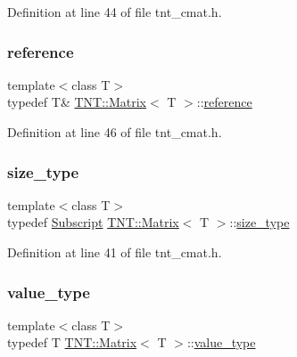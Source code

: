 Definition at line 44 of file tnt\+\_\+cmat.\+h.

\mbox{\label{classTNT_1_1Matrix_a129951783800dd85d3dcc1f6dd2062f9}} 
\subsubsection{\texorpdfstring{reference}{reference}}
{\footnotesize\ttfamily template$<$class T$>$ \\
typedef T\& \hyperlink{classTNT_1_1Matrix}{T\+N\+T\+::\+Matrix}$<$ T $>$\+::\hyperlink{classTNT_1_1Matrix_a129951783800dd85d3dcc1f6dd2062f9}{reference}}



Definition at line 46 of file tnt\+\_\+cmat.\+h.

\mbox{\label{classTNT_1_1Matrix_a42f57fd19de0ba2edce3734f41431727}} 
\subsubsection{\texorpdfstring{size\+\_\+type}{size\_type}}
{\footnotesize\ttfamily template$<$class T$>$ \\
typedef \hyperlink{namespaceTNT_af22e3f1460e145c04ce4e7d701e4c1c1}{Subscript} \hyperlink{classTNT_1_1Matrix}{T\+N\+T\+::\+Matrix}$<$ T $>$\+::\hyperlink{classTNT_1_1Matrix_a42f57fd19de0ba2edce3734f41431727}{size\+\_\+type}}



Definition at line 41 of file tnt\+\_\+cmat.\+h.

\mbox{\label{classTNT_1_1Matrix_a869b1a3e56a38bdaeb0b4f698b08e3c5}} 
\subsubsection{\texorpdfstring{value\+\_\+type}{value\_type}}
{\footnotesize\ttfamily template$<$class T$>$ \\
typedef T \hyperlink{classTNT_1_1Matrix}{T\+N\+T\+::\+Matrix}$<$ T $>$\+::\hyperlink{classTNT_1_1Matrix_a869b1a3e56a38bdaeb0b4f698b08e3c5}{value\+\_\+type}}



